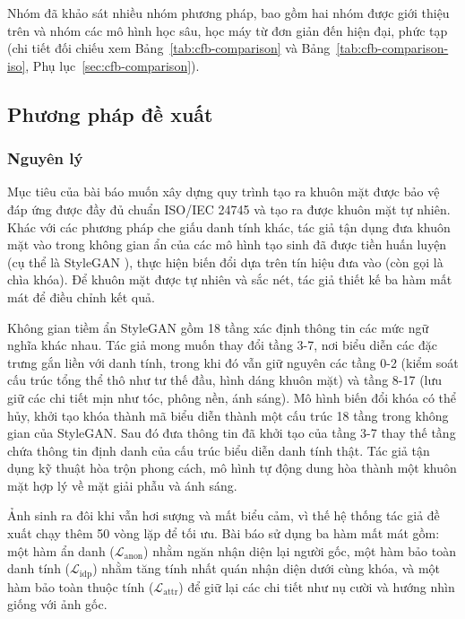 \documentclass[oneside,a4paper,12pt]{extarticle}
\begin{document}
Nhóm đã khảo sát nhiều nhóm phương pháp, bao gồm hai nhóm được giới thiệu trên và nhóm các mô hình học sâu, học máy từ đơn giản đến hiện đại, phức tạp (chi tiết đối chiếu xem Bảng~\ref{tab:cfb-comparison} và Bảng~\ref{tab:cfb-comparison-iso}, Phụ lục~\ref{sec:cfb-comparison}).

\subsection{Phương pháp đề xuất}
\label{sec::phuong-phap-de-xuat}

\subsubsection{Nguyên lý}

Mục tiêu của bài báo \cite{alam2025} muốn xây dựng quy trình tạo ra khuôn mặt được bảo vệ đáp ứng được đầy đủ chuẩn ISO/IEC 24745 \cite{iso24745} và tạo ra được khuôn mặt tự nhiên. Khác với các phương pháp che giấu danh tính khác, tác giả tận dụng đưa khuôn mặt vào trong không gian ẩn của các mô hình tạo sinh đã được tiền huấn luyện (cụ thể là StyleGAN \cite{karras2019stylegan}), thực hiện biến đổi dựa trên tín hiệu đưa vào (còn gọi là chìa khóa). Để khuôn mặt được tự nhiên và sắc nét, tác giả thiết kế ba hàm mất mát để điều chỉnh kết quả.

Không gian tiềm ẩn StyleGAN gồm 18 tầng xác định thông tin các mức ngữ nghĩa khác nhau. Tác giả mong muốn thay đổi tầng 3-7, nơi biểu diễn các đặc trưng gắn liền với danh tính, trong khi đó vẫn giữ nguyên các tầng 0-2 (kiểm soát cấu trúc tổng thể thô như tư thế đầu, hình dáng khuôn mặt) và tầng 8-17 (lưu giữ các chi tiết mịn như tóc, phông nền, ánh sáng). Mô hình biến đổi khóa có thể hủy, khởi tạo khóa thành mã biểu diễn thành một cấu trúc 18 tầng trong không gian của StyleGAN. Sau đó đưa thông tin đã khởi tạo của tầng 3-7 thay thế tầng chứa thông tin định danh của cấu trúc biểu diễn danh tính thật. Tác giả tận dụng kỹ thuật hòa trộn phong cách, mô hình tự động dung hòa thành một khuôn mặt hợp lý về mặt giải phẫu và ánh sáng.

Ảnh sinh ra đôi khi vẫn hơi sượng và mất biểu cảm, vì thế hệ thống tác giả đề xuất chạy thêm 50 vòng lặp để tối ưu. Bài báo sử dụng ba hàm mất mát gồm: một hàm ẩn danh ($\mathcal{L}_{\text{anon}}$) nhằm ngăn nhận diện lại người gốc, một hàm bảo toàn danh tính ($\mathcal{L}_{\text{idp}}$) nhằm tăng tính nhất quán nhận diện dưới cùng khóa, và một hàm bảo toàn thuộc tính ($\mathcal{L}_{\text{attr}}$) để giữ lại các chi tiết như nụ cười và hướng nhìn giống với ảnh gốc.
\end{document}
